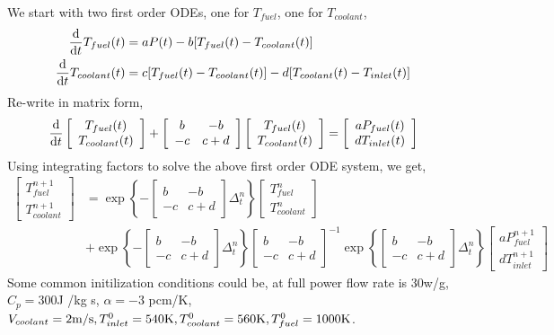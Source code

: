\documentclass{school-22.211-notes}
\begin{document}
\clearpage
{}
We start with two first order ODEs, one for $T_{fuel}$, one for $T_{coolant}$, 
\begin{align}
\frac{\mathrm{d}}{\mathrm{d}t} T_{fuel} (t) &= a P(t) - b [T_{fuel}(t) - T_{coolant}(t)] \\
\frac{\mathrm{d}}{\mathrm{d}t} T_{coolant} (t) &= c [T_{fuel}(t) - T_{coolant} (t) ] - d [T_{coolant} (t) - T_{inlet} (t) ] 
\end{align}
Re-write in matrix form, 
\begin{align}
\frac{\mathrm{d}}{\mathrm{d}t} \left[ \begin{array}{c} T_{fuel}(t) \\ T_{coolant} (t) \end{array} \right]
+ \left[ \begin{array}{cc} b & -b \\ -c & c+d \end{array} \right] 
\left[ \begin{array}{c} T_{fuel} (t) \\ T_{coolant} (t) \end{array} \right] 
= 
\left[ \begin{array}{c} a P_{fuel}(t) \\ d T_{inlet}(t) \end{array} \right]
\end{align}
Using integrating factors to solve the above first order ODE system,  we get, 
\begin{align}
 \left[ \begin{array}{c} T_{fuel}^{n+1} \\ T_{coolant}^{n+1} \end{array} \right]
&= \exp \left\{ -  \left[ \begin{array}{cc} b & -b \\ -c & c+d \end{array} \right] \Delta_t^n \right\}
\left[ \begin{array}{c} T_{fuel}^n \\ T_{coolant}^n \end{array} \right] \\
&+ \exp \left\{ -  \left[ \begin{array}{cc} b & -b \\ -c & c+d \end{array} \right] \Delta_t^n \right\}
\left[ \begin{array}{cc} b & -b \\ -c & c+d \end{array} \right]^{-1}
\exp \left\{ \left[ \begin{array}{cc} b & -b \\ -c & c+d \end{array} \right] \Delta_t^n \right\}
\left[ \begin{array}{c} a P_{fuel}^{n+1} \\ d T_{inlet}^{n+1} \end{array} \right]
\end{align}
Some common initilization conditions could be, at full power flow rate is 30w/g, $C_p = 300$J /kg s, $\alpha = -3$ pcm/K, $V_{coolant} = 2 \mathrm{m}/\mathrm{s}, T_{inlet}^0 = 540 \mathrm{K}, T_{coolant}^0 = 560 \mathrm{K}, T_{fuel}^0 = 1000 \mathrm{K}$. 
\end{document}

